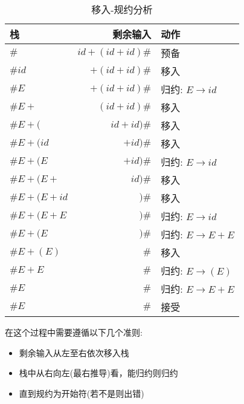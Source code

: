 \begin{table}[H]
    \centering
    \caption{移入-规约分析}
    \label{table:移入-规约分析}
    \setlength{\tabcolsep}{10mm}
    \begin{tabular}{l|r|l}
        \toprule
        \textbf{栈} & \textbf{剩余输入} & \textbf{动作}            \\
        \midrule
        $\#$        & $id+(id+id)\#$    & 预备                     \\
        $\#id$      & $+(id+id)\#$      & 移入                     \\
        $\#E$       & $+(id+id)\#$      & 归约: $E\rightarrow id$  \\
        $\#E+$      & $(id+id)\#$       & 移入                     \\
        $\#E+($     & $id+id)\#$        & 移入                     \\
        $\#E+(id$   & $+id)\#$          & 移入                     \\
        $\#E+(E$    & $+id)\#$          & 归约: $E\rightarrow id$  \\
        $\#E+(E+$   & $id)\#$           & 移入                     \\
        $\#E+(E+id$ & $)\#$             & 移入                     \\
        $\#E+(E+E$  & $)\#$             & 归约: $E\rightarrow id$  \\
        $\#E+(E$    & $)\#$             & 归约: $E\rightarrow E+E$ \\
        $\#E+(E)$   & $\#$              & 移入                     \\
        $\#E+E$     & $\#$              & 归约: $E\rightarrow (E)$ \\
        $\#E$       & $\#$              & 归约: $E\rightarrow E+E$ \\
        $\#E$       & $\#$              & 接受                     \\
        \bottomrule
    \end{tabular}
\end{table}

在这个过程中需要遵循以下几个准则:
\begin{itemize}
    \item 剩余输入从左至右依次移入栈
    \item 栈中从右向左(最右推导)看，能归约则归约
    \item 直到规约为开始符(若不是则出错)
\end{itemize}

